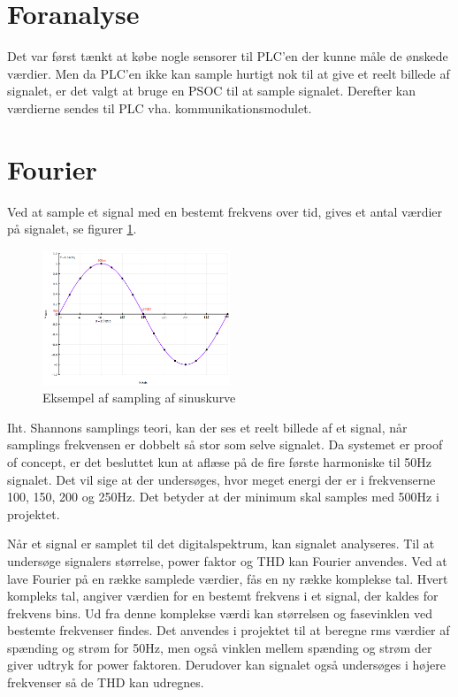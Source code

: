 
\section{Foranalyse}
Det var først tænkt at købe nogle sensorer til PLC'en der kunne måle de ønskede værdier. Men da PLC'en ikke kan sample hurtigt nok til at give et reelt billede af signalet, er det valgt at bruge en PSOC til at sample signalet. Derefter kan værdierne sendes til PLC vha. kommunikationsmodulet.

\section{Fourier}
Ved at sample et signal med en bestemt frekvens over tid, gives et antal værdier på signalet, se figurer \ref{fig:sample}.

\begin{figure}[htbp] %
	\centering
	\includegraphics[width=0.5\textwidth]{figure/sampling}
	\caption{Eksempel af sampling af sinuskurve}
	\label{fig:sample}
\end{figure}  

Iht. Shannons samplings teori\cite{Shannon}, kan der ses et reelt billede af et signal, når samplings frekvensen er dobbelt så stor som selve signalet. Da systemet er proof of concept, er det besluttet kun at aflæse på de fire første harmoniske til 50Hz signalet. Det vil sige at der undersøges, hvor meget energi der er i frekvenserne 100, 150, 200 og 250Hz. Det betyder at der minimum skal samples med 500Hz i projektet.

Når et signal er samplet til det digitalspektrum, kan signalet analyseres. Til at undersøge signalers størrelse, power faktor og THD kan Fourier anvendes. Ved at lave Fourier på en række samplede værdier, fås en ny række komplekse tal. Hvert kompleks tal, angiver værdien for en bestemt frekvens i et signal, der kaldes for frekvens bins. Ud fra denne komplekse værdi kan størrelsen og fasevinklen ved bestemte frekvenser findes. Det anvendes i projektet til at beregne rms værdier af spænding og strøm for 50Hz, men også vinklen mellem spænding og strøm der giver udtryk for power faktoren. Derudover kan signalet også undersøges i højere frekvenser så de THD kan udregnes.  

